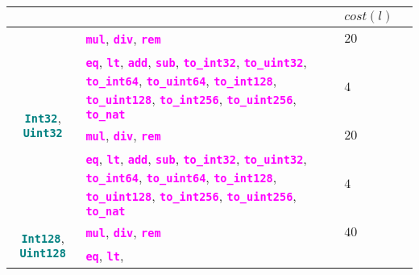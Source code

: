 \documentclass[9pt]{article}
\begin{document}
\begin{table}[!hbt]
\begin{tabular}{|c|p{4.1cm}|p{4cm}|p{4cm}|}
		 & \texttt{\textcolor{magenta}{}} & $cost(l)$  & \\ \hline \hline
		\multirow{4}{*}{\textbf{\texttt{\textcolor{teal}{Int32}}},
		\textbf{\texttt{\textcolor{teal}{Uint32}}}} &
		\textbf{\texttt{\textcolor{magenta}{mul}}},
		 \textbf{\texttt{\textcolor{magenta}{div}}},
		 \textbf{\texttt{\textcolor{magenta}{rem}}} &
		 $ 20  $  & \\ \cline{2-4}
		 & \textbf{\texttt{\textcolor{magenta}{eq}}},
		 \textbf{\texttt{\textcolor{magenta}{lt}}},
		 \textbf{\texttt{\textcolor{magenta}{add}}},
		 \textbf{\texttt{\textcolor{magenta}{sub}}},
		 \textbf{\texttt{\textcolor{magenta}{to\_int32}}},
		 \textbf{\texttt{\textcolor{magenta}{to\_uint32}}},
		 \textbf{\texttt{\textcolor{magenta}{to\_int64}}},
		 \textbf{\texttt{\textcolor{magenta}{to\_uint64}}},
		 \textbf{\texttt{\textcolor{magenta}{to\_int128}}},
		 \textbf{\texttt{\textcolor{magenta}{to\_uint128}}},
		 \textbf{\texttt{\textcolor{magenta}{to\_int256}}},
		 \textbf{\texttt{\textcolor{magenta}{to\_uint256}}},
		 \textbf{\texttt{\textcolor{magenta}{to\_nat}}}
		 & $4$  & \\ \hline \hline
		\multirow{4}{*}{\textbf{\texttt{\textcolor{teal}{Int64}}},
		\textbf{\texttt{\textcolor{teal}{Uint64}}}} &
		\textbf{\texttt{\textcolor{magenta}{mul}}},
		 \textbf{\texttt{\textcolor{magenta}{div}}},
		 \textbf{\texttt{\textcolor{magenta}{rem}}} &
		 $ 20 $  & \\ \cline{2-4}
		 & 
		 \textbf{\texttt{\textcolor{magenta}{eq}}},
		 \textbf{\texttt{\textcolor{magenta}{lt}}},
		 \textbf{\texttt{\textcolor{magenta}{add}}},
		 \textbf{\texttt{\textcolor{magenta}{sub}}},
		 \textbf{\texttt{\textcolor{magenta}{to\_int32}}},
		 \textbf{\texttt{\textcolor{magenta}{to\_uint32}}},
		 \textbf{\texttt{\textcolor{magenta}{to\_int64}}},
		 \textbf{\texttt{\textcolor{magenta}{to\_uint64}}},
		 \textbf{\texttt{\textcolor{magenta}{to\_int128}}},
		 \textbf{\texttt{\textcolor{magenta}{to\_uint128}}},
		 \textbf{\texttt{\textcolor{magenta}{to\_int256}}},
		 \textbf{\texttt{\textcolor{magenta}{to\_uint256}}},
		 \textbf{\texttt{\textcolor{magenta}{to\_nat}}}
		 & $4$  & \\ \hline \hline
		\multirow{4}{*}{\textbf{\texttt{\textcolor{teal}{Int128}}},
		\textbf{\texttt{\textcolor{teal}{Uint128}}}} &
		\textbf{\texttt{\textcolor{magenta}{mul}}},
		 \textbf{\texttt{\textcolor{magenta}{div}}},
		 \textbf{\texttt{\textcolor{magenta}{rem}}} &
		 $ 40 $  & \\ \cline{2-4}
		 & 
		 \textbf{\texttt{\textcolor{magenta}{eq}}},
		 \textbf{\texttt{\textcolor{magenta}{lt}}},

\end{tabular}
\end{table}
\end{document}
